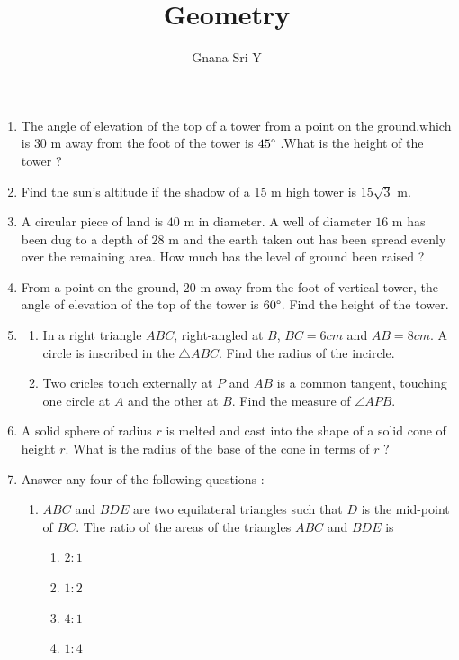 \documentclass[11pt]{article}
\begin{document}
\title{Geometry}
\author{Gnana Sri  Y}
\maketitle

\begin{enumerate}
	\item The angle of elevation of the top of a tower from a point on the ground,which is $30$ m away from the foot of the tower is $45\degree$ .What is the height of the tower ?
	\item Find the sun's altitude if the shadow of a 15 m high tower is ${15}\sqrt{3}$ m.
	\item A circular piece of land is $40$ m in diameter. A well of diameter $16$ m has been dug to a depth of $28$ m and the earth taken out has been spread evenly over the remaining area. How much has the level of ground been raised ?
	\item From a point on the ground, $20$ m away from the foot of vertical tower, the angle of elevation of the top of the tower is $60\degree$. Find the height of the tower.
	\item
	\begin{enumerate}
		\item In a right triangle $ABC$, right-angled at $B$, $BC= 6 cm$ and $AB = 8 cm$. A circle is inscribed in the ${\triangle} ABC$. Find the radius of the incircle.
		\item Two cricles touch externally at $P$ and $AB$ is a common tangent, touching one circle at $A$ and the other at $B$. Find the measure of $\angle APB$.
	\end{enumerate}
	\item A solid sphere of radius $r$ is melted and cast into the shape of a solid cone of height $r$. What is the radius of the base of the cone in terms of $r$ ?
	\item Answer any four of the following questions :
		\begin{enumerate}[label=(\roman*)]
			\item $ABC$ and $BDE$ are two equilateral triangles such that $D$ is the mid-point of $BC$. The ratio of the areas of the triangles $ABC$ and $BDE$ is
				\begin{enumerate}[label=(\Alph*)]
					\item $2 : 1$
					\item $1 : 2$
					\item $4 : 1$
					\item $1 : 4$
				\end{enumerate}

\end{enumerate}
\end{enumerate}
\end{document}
